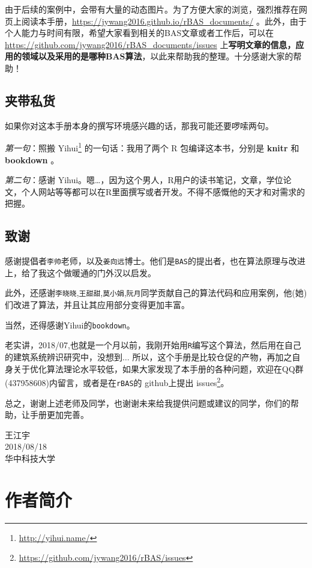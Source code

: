 \documentclass[]{ctexbook}
\renewcommand{\href}[2]{#2\footnote{\url{#1}}}
\theoremstyle{definition}
\theoremstyle{definition}
\theoremstyle{definition}
\theoremstyle{remark}
\let\BeginKnitrBlock\begin \let\EndKnitrBlock\end
\begin{document}
由于后续的案例中，会带有大量的动态图片。为了方便大家的浏览，强烈推荐在网页上阅读本手册，\url{https://jywang2016.github.io/rBAS_documents/}
。此外，由于个人能力与时间有限，希望大家看到相关的BAS文章或者工作后，可以在
\url{https://github.com/jywang2016/rBAS_documents/issues}
上\textbf{写明文章的信息，应用的领域以及采用的是哪种BAS算法}，以此来帮助我的整理。十分感谢大家的帮助！

\section*{夹带私货}


如果你对这本手册本身的撰写环境感兴趣的话，那我可能还要啰嗦两句。

\emph{第一句}：照搬 \href{http://yihui.name/}{Yihui}
的一句话：我用了两个 R 包编译这本书，分别是 \textbf{knitr}
\citep{xie2015} 和 \textbf{bookdown}
\citep{R-bookdown}。

\emph{第二句}：感谢
Yihui。嗯\ldots{}，因为这个男人，R用户的读书笔记，文章，学位论文，个人网站等等都可以在R里面撰写或者开发。不得不感慨他的天才和对需求的把握。

\section*{致谢}


感谢提倡者\texttt{李帅}老师，以及\texttt{姜向远}博士。他们是\texttt{BAS}的提出者，也在算法原理与改进上，给了我这个做暖通的门外汉以启发。

此外，还感谢\texttt{李晓晓},\texttt{王甜甜},\texttt{莫小娟},\texttt{阮月}同学贡献自己的算法代码和应用案例，他(她)们改进了算法，并且让其应用部分变得更加丰富。

当然，还得感谢Yihui的\texttt{bookdown}。

老实讲，2018/07,也就是一个月以前，我刚开始用\texttt{R}编写这个算法，然后用在自己的建筑系统辨识研究中，没想到\(\dots\)
所以，这个手册是比较仓促的产物，再加之自身关于优化算法理论水平较低，如果大家发现了本手册的各种问题，欢迎在QQ群(437958608)内留言，或者是在\texttt{rBAS}的
github上提出 \href{https://github.com/jywang2016/rBAS/issues}{issues}。

总之，谢谢上述老师及同学，也谢谢未来给我提供问题或建议的同学，你们的帮助，让手册更加完善。

\BeginKnitrBlock{flushright}
王江宇\\
2018/08/18\\
华中科技大学
\EndKnitrBlock{flushright}

\chapter*{作者简介}\label{author}
\end{document}
